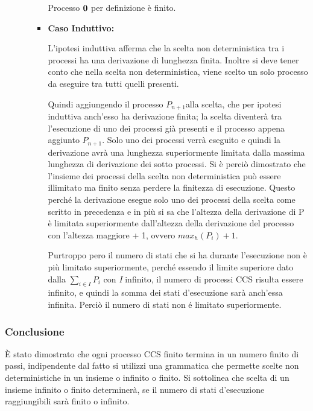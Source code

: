 \begin{itemize}
\begin{itemize}
\begin{itemize}
			Processo $\mathbf{0}$ per definizione è finito.
			\\
			\item[] \textbf{Caso Induttivo:} \mbox{}
			
			L'ipotesi induttiva afferma che la scelta non deterministica tra i processi ha una derivazione di lunghezza finita. Inoltre si deve tener conto che nella scelta non deterministica, viene scelto un solo processo da eseguire tra tutti quelli presenti.
			
			Quindi aggiungendo il processo \(P_{n+1}\)alla scelta, che per ipotesi induttiva anch'esso ha derivazione finita; la scelta diventerà tra l'esecuzione di uno dei processi già presenti e il processo appena aggiunto \(P_{n+1}\). Solo uno dei processi verrà eseguito e quindi la derivazione avrà una lunghezza superiormente limitata dalla massima lunghezza di derivazione dei sotto processi. Si è perciò dimostrato che l'insieme dei processi della scelta non deterministica può essere illimitato ma finito senza perdere la finitezza di esecuzione. Questo perché la derivazione esegue solo uno dei processi della scelta come scritto in precedenza e in più si sa che l'altezza della derivazione di P è limitata superiormente dall'altezza della derivazione del processo con l'altezza maggiore + 1, ovvero \(max_h(P_i) + 1\). 
			
			Purtroppo pero il numero di stati che si ha durante l'esecuzione non è più limitato superiormente, perché essendo il limite superiore dato dalla  $\displaystyle\sum_{i\in I}^{}P_{i}$ con \textit{I} infinito, il numero di processi CCS risulta essere infinito, e quindi la somma dei stati d'esecuzione sarà anch'essa infinita. Perciò il numero di stati non é limitato superiormente.
			
			 
		\end{itemize}
		
	\end{itemize}

\end{itemize}

\subsubsection{Conclusione}
È stato dimostrato che ogni processo CCS finito termina in un numero finito di passi, indipendente dal fatto si utilizzi una grammatica che permette scelte non deterministiche in un insieme o infinito o finito. Si sottolinea che scelta di un insieme infinito o finito determinerà, se il numero di stati d'esecuzione raggiungibili sarà finito o infinito.
